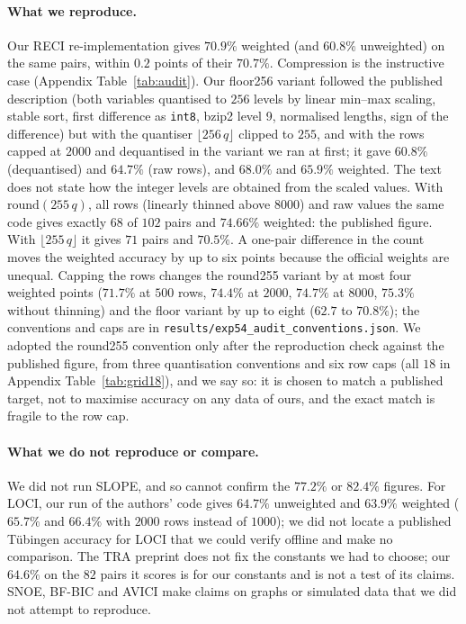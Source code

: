 \paragraph{What we reproduce.} Our RECI re-implementation gives $70.9\%$ weighted (and $60.8\%$ unweighted) on the same pairs, within $0.2$ points of their $70.7\%$. Compression is the instructive case (Appendix Table~\ref{tab:audit}). Our floor256 variant followed the published description (both variables quantised to $256$ levels by linear min--max scaling, stable sort, first difference as \texttt{int8}, bzip2 level 9, normalised lengths, sign of the difference) but with the quantiser $\lfloor 256\,q\rfloor$ clipped to $255$, and with the rows capped at $2000$ and dequantised in the variant we ran at first; it gave $60.8\%$ (dequantised) and $64.7\%$ (raw rows), and $68.0\%$ and $65.9\%$ weighted. The text does not state how the integer levels are obtained from the scaled values. With $\mathrm{round}(255\,q)$, all rows (linearly thinned above $8000$) and raw values the same code gives exactly $68$ of $102$ pairs and $74.66\%$ weighted: the published figure. With $\lfloor 255\,q\rfloor$ it gives $71$ pairs and $70.5\%$. A one-pair difference in the count moves the weighted accuracy by up to six points because the official weights are unequal. Capping the rows changes the round255 variant by at most four weighted points ($71.7\%$ at $500$ rows, $74.4\%$ at $2000$, $74.7\%$ at $8000$, $75.3\%$ without thinning) and the floor variant by up to eight ($62.7$ to $70.8\%$); the conventions and caps are in \texttt{results/exp54\_audit\_conventions.json}. We adopted the round255 convention only after the reproduction check against the published figure, from three quantisation conventions and six row caps (all $18$ in Appendix Table~\ref{tab:grid18}), and we say so: it is chosen to match a published target, not to maximise accuracy on any data of ours, and the exact match is fragile to the row cap.



\paragraph{What we do not reproduce or compare.} We did not run SLOPE, and so cannot confirm the $77.2\%$ or $82.4\%$ figures. For LOCI, our run of the authors' code gives $64.7\%$ unweighted and $63.9\%$ weighted ($65.7\%$ and $66.4\%$ with $2000$ rows instead of $1000$); we did not locate a published T\"ubingen accuracy for LOCI that we could verify offline and make no comparison. The TRA preprint does not fix the constants we had to choose; our $64.6\%$ on the $82$ pairs it scores is for our constants and is not a test of its claims. SNOE, BF-BIC and AVICI make claims on graphs or simulated data that we did not attempt to reproduce.

